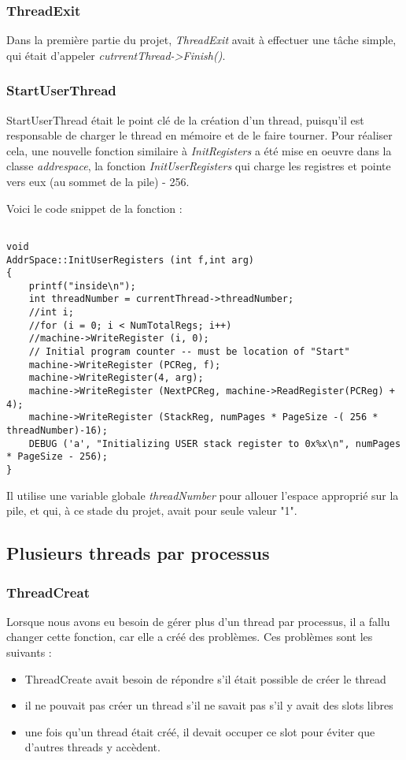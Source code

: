 \documentclass{article}
\begin{document}
\subsubsection{ThreadExit}
Dans la première partie du projet, \textit{ThreadExit} avait à effectuer une tâche simple, qui était d'appeler \textit{cutrrentThread->Finish()}.

\subsubsection{StartUserThread}
StartUserThread était le point clé de la création d'un thread, puisqu'il est responsable de charger le thread en mémoire et de le faire tourner. Pour réaliser cela, une nouvelle fonction similaire à \textit{InitRegisters} a été mise en oeuvre dans la classe \textit{addrespace}, la fonction \textit{InitUserRegisters} qui charge les registres et pointe vers eux (au sommet de la pile) - 256.

Voici le code snippet de la fonction :
\begin{verbatim}

void
AddrSpace::InitUserRegisters (int f,int arg)
{
    printf("inside\n");
    int threadNumber = currentThread->threadNumber;
    //int i;
    //for (i = 0; i < NumTotalRegs; i++)
    //machine->WriteRegister (i, 0);
    // Initial program counter -- must be location of "Start"
    machine->WriteRegister (PCReg, f);
    machine->WriteRegister(4, arg);
    machine->WriteRegister (NextPCReg, machine->ReadRegister(PCReg) + 4);
    machine->WriteRegister (StackReg, numPages * PageSize -( 256 * threadNumber)-16);
    DEBUG ('a', "Initializing USER stack register to 0x%x\n", numPages * PageSize - 256);
}
\end{verbatim}

Il utilise une variable globale \textit{threadNumber} pour allouer l'espace approprié sur la pile, et qui, à ce stade du projet, avait pour seule valeur "1".


\subsection{Plusieurs threads par processus}

\subsubsection{ThreadCreat}

Lorsque nous avons eu besoin de gérer plus d'un thread par processus, il a fallu changer cette fonction, car elle a créé des problèmes. 
Ces problèmes sont les suivants : 
\begin{itemize}
\item{ThreadCreate avait besoin de répondre s'il était possible de créer le thread}
\item{il ne pouvait pas créer un thread s'il ne savait pas s'il y avait des slots libres}
\item{une fois qu'un thread était créé, il devait occuper ce slot pour éviter que d'autres threads y accèdent.}


\end{itemize}
\end{document}
